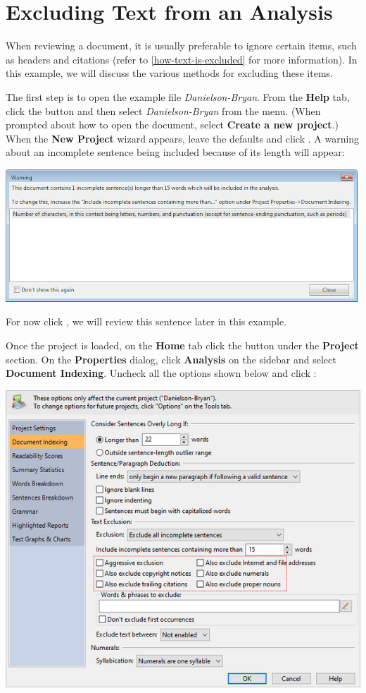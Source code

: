\documentclass[
]{book}
\theoremstyle{definition}
\theoremstyle{definition}
\theoremstyle{definition}
\theoremstyle{definition}
\theoremstyle{remark}
\begin{document}
\newpage

\hypertarget{excluding-text-from-analysis}{%
\section{Excluding Text from an Analysis}\label{excluding-text-from-analysis}}

When reviewing a document, it is usually preferable to ignore certain items, such as headers and citations (refer to \ref{how-text-is-excluded} for more information). In this example, we will discuss the various methods for excluding these items.

The first step is to open the example file \emph{Danielson-Bryan}. From the \textbf{Help} tab, click the  button and then select \emph{Danielson-Bryan} from the menu. (When prompted about how to open the document, select \textbf{Create a new project}.) When the \textbf{New Project} wizard appears, leave the defaults and click . A warning about an incomplete sentence being included because of its length will appear:

\begin{center}\includegraphics[width=0.75\linewidth,]{Images/NonGenerated/ExclusionExampleIncompleteSentWarning} \end{center}

For now click , we will review this sentence later in this example.

Once the project is loaded, on the \textbf{Home} tab click the  button under the \textbf{Project} section. On the \textbf{Properties} dialog, click \textbf{Analysis} on the sidebar and select \textbf{Document Indexing}. Uncheck all the options shown below and click :

\includegraphics{Images/ExclusionExampleAllExcluded.png}
\end{document}
